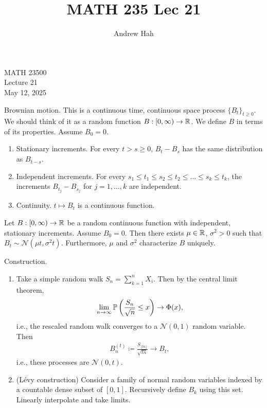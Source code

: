 \documentclass[11pt]{article}
\title{MATH 235 Lec 21}
\author{Andrew Hah}
\begin{document}
\pagestyle{plain}
\begin{center}
{\Large MATH 23500} \\
{\Large Lecture 21} \\
\vspace{.2in}
May 12, 2025
\end{center}

Brownian motion. This is a continuous time, continuous space process $\{ B_t \}_{t \ge 0}$. We should think of it as a random function $B: [0, \infty) \to \mathbb{R}$. We define $B$ in terms of its properties. Assume $B_0 = 0$. \begin{enumerate}
\item Stationary increments. For every $t > s \ge 0$, $B_t - B_s$ has the same distribution as $B_{t - s}$.
\item Independent increments. For every $s_1 \le t_1 \le s_2 \le t_2 \le \dots \le s_k \le t_k$, the increments $B_{t_j} - B_{s_j}$ for $j = 1, \dots, k$ are independent.
\item Continuity. $t \mapsto B_t$ is a continuous function.
\end{enumerate}

\begin{theorem} Let $B: [0, \infty) \to \mathbb{R}$ be a random continuous function with independent, stationary increments. Assume $B_0 = 0$. Then there exists $\mu \in \mathbb{R}$, $\sigma^2 > 0$ such that $B_t \sim \mathcal{N}(\mu t, \sigma^2 t)$. Furthermore, $\mu$ and $\sigma^2$ characterize $B$ uniquely. 
\end{theorem}

Construction.
\begin{enumerate}
  \item Take a simple random walk $S_n = \sum_{k = 1}^n X_i$. Then by the central limit theorem, \begin{align*} \lim_{n \to \infty} \mathbb{P} \left( \frac{S_n}{\sqrt{n}} \le x \right) \to \Phi (x),
  \end{align*} i.e., the rescaled random walk converges to a $\mathcal{N}(0, 1)$ random variable. Then \begin{align*} B_n^{(t)} \coloneqq \frac{S_{\lfloor tn \rfloor}}{\sqrt{tn}} \to B_t,
  \end{align*} i.e., these processes are $\mathcal{N}(0, t)$.
  \item (Lévy construction) Consider a family of normal random variables indexed by a countable dense subset of $[0, 1]$. Recursively define $B_k$ using this set. Linearly interpolate and take limits. 
  \end{enumerate}
\end{document}
